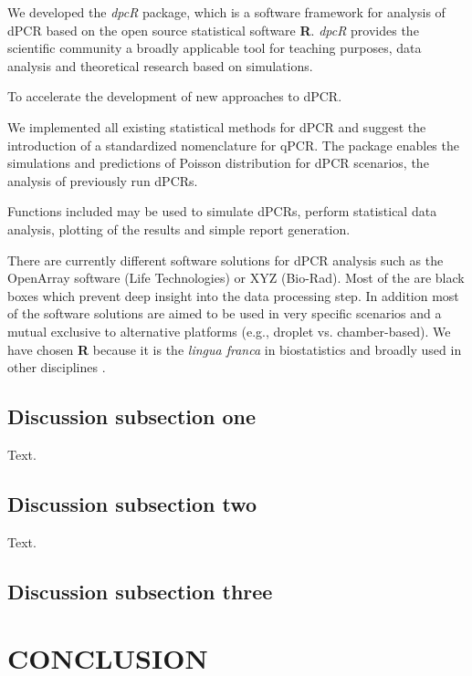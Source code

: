 \documentclass[a4,center,fleqn]{NAR}
\begin{document}
We developed the \textit{dpcR} package, which is a software framework for analysis of 
dPCR based on the open source statistical software \textbf{R}. \textit{dpcR} provides the scientific 
community a broadly applicable tool for teaching purposes, data analysis and theoretical research based on simulations. 

To accelerate the development of new approaches to dPCR. 

We implemented all existing statistical methods for dPCR and suggest the 
introduction of a standardized nomenclature for qPCR. The package enables the 
simulations and predictions of Poisson distribution for dPCR scenarios, the 
analysis of previously run dPCRs.

Functions included may be used to simulate dPCRs, perform statistical data 
analysis, plotting of the results and simple report generation. 

There are currently different software solutions for dPCR analysis such as the 
OpenArray software (Life Technologies) or XYZ (Bio-Rad). Most of the are black 
boxes which prevent deep insight into the data processing step. In addition most 
of the software solutions are aimed to be used in very specific scenarios and a 
mutual exclusive to alternative platforms (e.g., droplet vs. chamber-based). We 
have chosen \textbf{R} because it is the \textit{lingua franca} in biostatistics and broadly used 
in other disciplines \cite{rodiger_r_2015}.

\subsection{Discussion subsection one}

Text.


\subsection{Discussion subsection two}

Text.


\subsection{Discussion subsection three}


\section{CONCLUSION}
\end{document}
